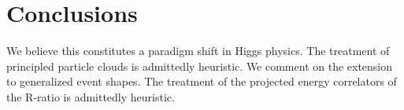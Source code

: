 \section{Conclusions}\label{sec:conclusions}

We believe this constitutes a paradigm shift in Higgs physics. The
treatment of principled particle clouds is admittedly heuristic. We
comment on the extension to generalized event shapes. The treatment of
the projected energy correlators of the R-ratio is admittedly heuristic.

